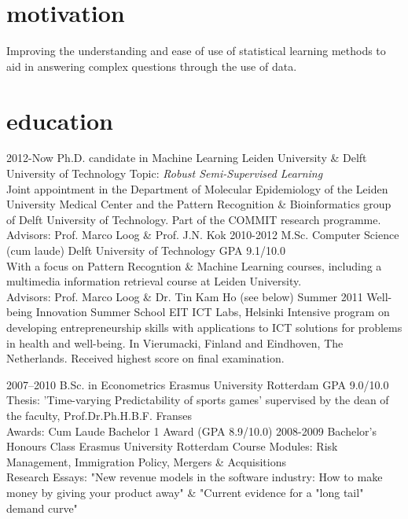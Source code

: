 \documentclass[]{friggeri-cv}
\begin{document}
\section{motivation}

Improving the understanding and ease of use of statistical learning methods to aid in answering complex questions through the use of data.

\section{education}

\begin{entrylist}
  \entry
    {2012-Now}
    {Ph.D. candidate in Machine Learning}
    {Leiden University \& Delft University of Technology}
    {Topic: \emph{Robust Semi-Supervised Learning} \\
    Joint appointment in the Department of Molecular Epidemiology of the Leiden University Medical Center and the Pattern Recognition \& Bioinformatics group of Delft University of Technology. Part of the COMMIT research programme.\\
    Advisors: Prof. Marco Loog \& Prof. J.N. Kok}
  \entry
    {2010-2012}
    {M.Sc. Computer Science (cum laude)}
    {Delft University of Technology}
    {GPA 9.1/10.0 \\
	   With a focus on Pattern Recogntion \& Machine Learning courses, including a multimedia information retrieval course at Leiden University. \\
    Advisors: Prof. Marco Loog \&  Dr. Tin Kam Ho (see below)}
    \entry
  {Summer 2011}
  {Well-being Innovation Summer School}
  {EIT ICT Labs, Helsinki}
  {Intensive program on developing entrepreneurship skills with applications to ICT solutions for problems in health and well-being. In Vierumacki,
Finland and Eindhoven, The Netherlands. Received highest score on final examination.} %

  \entry
    {2007–2010}
    {B.Sc. in Econometrics}
    {Erasmus University Rotterdam}
    {GPA 9.0/10.0 \\
		Thesis:	'Time-varying Predictability of sports games' supervised by the dean of the faculty, Prof.Dr.Ph.H.B.F. Franses\\
		Awards:	Cum Laude Bachelor 1 Award (GPA 8.9/10.0)
				}
		\entry
		  {2008-2009} %
      {Bachelor's Honours Class}
      {Erasmus University Rotterdam}
		  {Course Modules: Risk Management, Immigration Policy, Mergers \& Acquisitions\\
		Research Essays: "New revenue models in the software industry: How to make money by giving your product away" \&  "Current evidence for a "long tail" demand curve"
			}


\end{entrylist}
\end{document}
